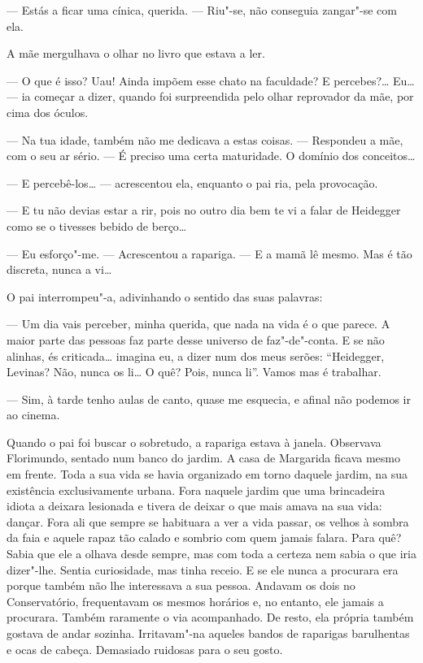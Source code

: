 --- Estás a ficar uma cínica, querida. ---  Riu"-se, não conseguia zangar"-se
com ela.

A mãe mergulhava o olhar no livro que estava a ler.

--- O que é isso? Uau! Ainda impõem esse chato na faculdade? E
percebes?\ldots{} Eu\ldots{} --- ia começar a dizer, quando foi surpreendida pelo
olhar reprovador da mãe, por cima dos óculos.

--- Na tua idade, também não me dedicava a estas coisas. --- Respondeu a
mãe, com o seu ar sério. --- É preciso uma certa maturidade. O domínio dos
conceitos\ldots{}

--- E percebê-los\ldots{} --- acrescentou ela, enquanto o pai ria, pela
provocação.

--- E tu não devias estar a rir, pois no outro dia bem te vi a falar de
Heidegger como se o tivesses bebido de berço\ldots{}

--- Eu esforço"-me. --- Acrescentou a rapariga. --- E a mamã lê mesmo. Mas é
tão discreta, nunca a vi\ldots{}

O pai interrompeu"-a, adivinhando o sentido das suas palavras:

--- Um dia vais perceber, minha querida, que nada na vida é o que parece.
A maior parte das pessoas faz parte desse universo de faz"-de"-conta. E se
não alinhas, és criticada\ldots{} imagina eu, a dizer num dos meus serões:
``Heidegger, Levinas? Não, nunca os li\ldots{} O quê? Pois, nunca li''. Vamos
mas é trabalhar.

--- Sim, à tarde tenho aulas de canto, quase me esquecia, e afinal não
podemos ir ao cinema.

Quando o pai foi buscar o sobretudo, a rapariga estava à janela.
Observava Florimundo, sentado num banco do jardim. A casa de Margarida
ficava mesmo em frente. Toda a sua vida se havia organizado em torno
daquele jardim, na sua existência exclusivamente urbana. Fora naquele
jardim que uma brincadeira idiota a deixara lesionada e tivera de deixar
o que mais amava na sua vida: dançar. Fora ali que sempre se habituara a
ver a vida passar, os velhos à sombra da faia e aquele rapaz tão calado
e sombrio com quem jamais falara. Para quê? Sabia que ele a olhava desde
sempre, mas com toda a certeza nem sabia o que iria dizer"-lhe. Sentia
curiosidade, mas tinha receio. E se ele nunca a procurara era porque
também não lhe interessava a sua pessoa. Andavam os dois no
Conservatório, frequentavam os mesmos horários e, no entanto, ele jamais
a procurara. Também raramente o via acompanhado. De resto, ela própria
também gostava de andar sozinha. Irritavam"-na aqueles bandos de
raparigas barulhentas e ocas de cabeça. Demasiado ruidosas para o seu
gosto.

